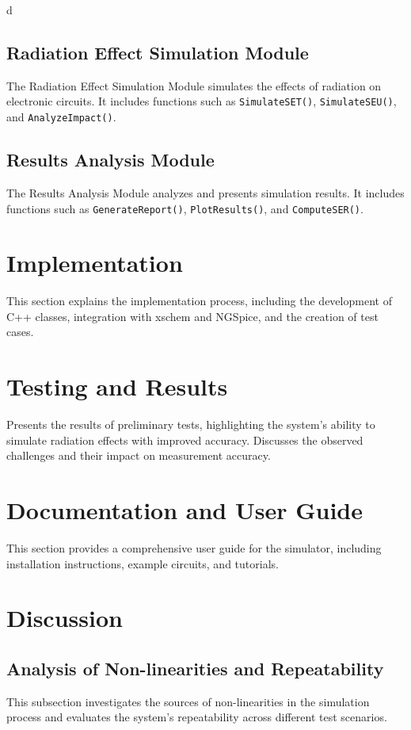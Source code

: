 d\documentclass[conference]{IEEEtran}
\begin{document}
\subsection{Radiation Effect Simulation Module}
The Radiation Effect Simulation Module simulates the effects of radiation on electronic circuits. It includes functions such as \texttt{SimulateSET()}, \texttt{SimulateSEU()}, and \texttt{AnalyzeImpact()}.

\subsection{Results Analysis Module}
The Results Analysis Module analyzes and presents simulation results. It includes functions such as \texttt{GenerateReport()}, \texttt{PlotResults()}, and \texttt{ComputeSER()}.

\section{Implementation}
This section explains the implementation process, including the development of C++ classes, integration with xschem and NGSpice, and the creation of test cases.

\section{Testing and Results}
Presents the results of preliminary tests, highlighting the system's ability to simulate radiation effects with improved accuracy. Discusses the observed challenges and their impact on measurement accuracy.

\section{Documentation and User Guide}
This section provides a comprehensive user guide for the simulator, including installation instructions, example circuits, and tutorials.

\section{Discussion}
\subsection{Analysis of Non-linearities and Repeatability}
This subsection investigates the sources of non-linearities in the simulation process and evaluates the system's repeatability across different test scenarios.
\end{document}
